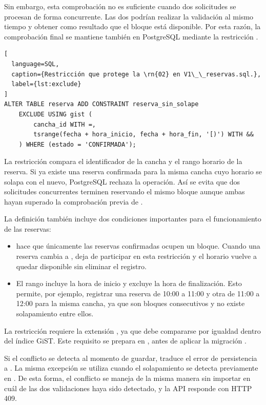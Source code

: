 Sin embargo, esta comprobación no es suficiente cuando dos solicitudes se
procesan de forma concurrente. Las dos podrían realizar la validación al mismo
tiempo y obtener como resultado que el bloque está disponible. Por esta razón,
la comprobación final se mantiene también en PostgreSQL mediante la restricción
.

\begin{lstlisting}[
  language=SQL,
  caption={Restricción que protege la \rn{02} en V1\_\_reservas.sql.},
  label={lst:exclude}
]
ALTER TABLE reserva ADD CONSTRAINT reserva_sin_solape
    EXCLUDE USING gist (
        cancha_id WITH =,
        tsrange(fecha + hora_inicio, fecha + hora_fin, '[)') WITH &&
    ) WHERE (estado = 'CONFIRMADA');
\end{lstlisting}

La restricción compara el identificador de la cancha y el rango horario de la
reserva. Si ya existe una reserva confirmada para la misma cancha cuyo horario
se solapa con el nuevo, PostgreSQL rechaza la operación. Así se evita que dos
solicitudes concurrentes terminen reservando el mismo bloque aunque ambas hayan
superado la comprobación previa de .

La definición también incluye dos condiciones importantes para el funcionamiento
de las reservas:

\begin{itemize}
    \item {} hace que únicamente las reservas
    confirmadas ocupen un bloque. Cuando una reserva cambia a
    , deja de participar en esta restricción y el horario vuelve
    a quedar disponible sin eliminar el registro.

    \item El rango \id{'[)'} incluye la hora de inicio y excluye la hora de
    finalización. Esto permite, por ejemplo, registrar una reserva de
    10:00 a 11:00 y otra de 11:00 a 12:00 para la misma cancha, ya que son
    bloques consecutivos y no existe solapamiento entre ellos.
\end{itemize}

La restricción requiere la extensión , ya que
 debe compararse por igualdad dentro del índice GiST.
Este requisito se prepara en ,
antes de aplicar la migración .

Si el conflicto se detecta al momento de guardar, 
traduce el error de persistencia a . La misma
excepción se utiliza cuando el solapamiento se detecta previamente en
. De esta forma, el conflicto se maneja de la misma manera
sin importar en cuál de las dos validaciones haya sido detectado, y la API
responde con HTTP 409.

